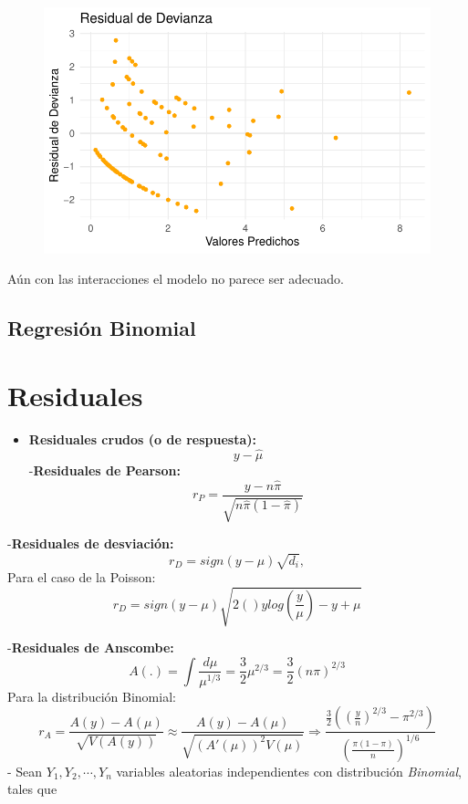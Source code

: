 \documentclass[
  letterpaper,
  DIV=11,
  numbers=noendperiod]{scrartcl}
\providecommand{\tightlist}{%
  \setlength{\itemsep}{0pt}\setlength{\parskip}{0pt}}\usepackage{longtable,booktabs,array}
\begin{document}
\begin{figure}
%
\begin{minipage}{0.50\linewidth}
\includegraphics{Modelos_files/figure-pdf/unnamed-chunk-37-4.pdf}\end{minipage}%

\end{figure}%

Aún con las interacciones el modelo no parece ser adecuado.

\subsection{Regresión Binomial}\label{regresiuxf3n-binomial}

\section{Residuales}\label{residuales-1}

\begin{itemize}
\tightlist
\item
  \textbf{Residuales crudos (o de respuesta):} \[y-\hat{\mu}\]
  -\textbf{Residuales de Pearson:}
  \[r_{P}=\frac{y-n\hat{\pi}}{\sqrt{n\hat{\pi}(1-\hat{\pi})}}\]
\end{itemize}

-\textbf{Residuales de desviación:} \[r_{D}=sign(y-\mu)\sqrt{d_{i}},\]
Para el caso de la Poisson:
\[r_{D}=sign(y-\mu)\sqrt{2()ylog(\frac{y}{\mu})-y+\mu}\]

-\textbf{Residuales de Anscombe:}
\[A(.)=\int\frac{d\mu}{\mu^{1/3}}=\frac{3}{2}\mu^{2/3}=\frac{3}{2}(n\pi)^{2/3}\]
Para la distribución Binomial:
\[r_{A}=\frac{A(y)-A(\mu)}{\sqrt{V(A(y))}}\approx\frac{A(y)-A(\mu)}{\sqrt{(A'(\mu))^{2}V(\mu)}}\Longrightarrow\frac{\frac{3}{2}((\frac{y}{n})^{2/3}-\pi^{2/3})}{(\frac{\pi(1-\pi)}{n})^{1/6}}\]
- Sean \(Y_1, Y_2, \cdots, Y_n\) variables aleatorias independientes con
distribución \emph{Binomial}, tales que
\end{document}
